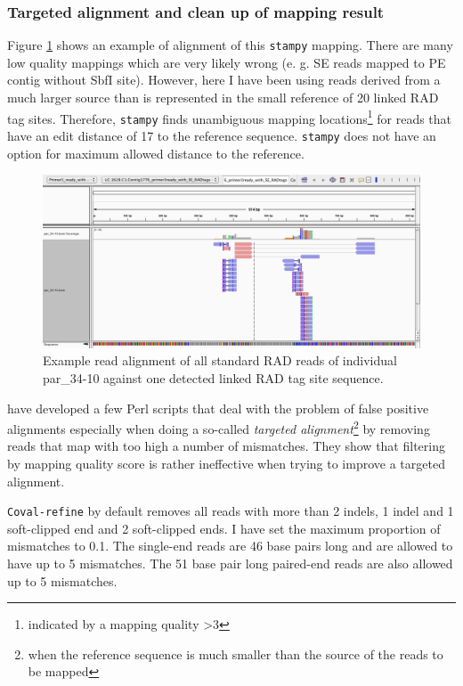 \documentclass[a4paper,12pt,times,print,index, custombib]{PhDThesisPSnPDF}\usepackage[]{graphicx}\usepackage[]{color}
\begin{document}
\subsubsection{Targeted alignment and clean up of mapping result}

Figure \ref{stampy_par_34-10_vs_primer3ready_igv} shows an example of alignment of this \texttt{stampy} mapping. There are many low quality mappings which are very likely wrong (e. g. SE reads mapped to PE contig without SbfI site). However, here I have been using reads derived from a much larger source than is represented in the small reference of 20 \glspl{linked RAD tag site}. Therefore, \texttt{stampy} finds unambiguous mapping locations\footnote{indicated by a mapping quality >3} for reads that have an \gls{edit distance} of 17 to the reference sequence. \texttt{stampy} does not have an option for maximum allowed distance to the reference.

\begin{figure}
\centering
\includegraphics[width=\textwidth]{stampy_par_34-10_vs_primer3ready_igv}
\caption{Example read alignment of all standard RAD reads of individual par\_34-10 against one detected \gls{linked RAD tag site} sequence.}
\label{stampy_par_34-10_vs_primer3ready_igv}
\end{figure}

\cite{Kosugi2013} have developed a few Perl scripts that deal with the problem of false positive alignments especially when doing a so-called \emph{targeted alignment}\footnote{when the reference sequence is much smaller than the source of the reads to be mapped} by removing reads that map with too high a number of mismatches. They show that filtering by mapping quality score is rather ineffective when trying to improve a targeted alignment. 

\texttt{Coval-refine} by default removes all reads with more than 2 \glspl{indel}, 1 indel and 1 soft-clipped end and 2 soft-clipped ends. I have set the maximum proportion of mismatches to 0.1. The single-end reads are 46 base pairs long and are allowed to have up to 5 mismatches. The 51 base pair long paired-end reads are also allowed up to 5 mismatches.
\end{document}
